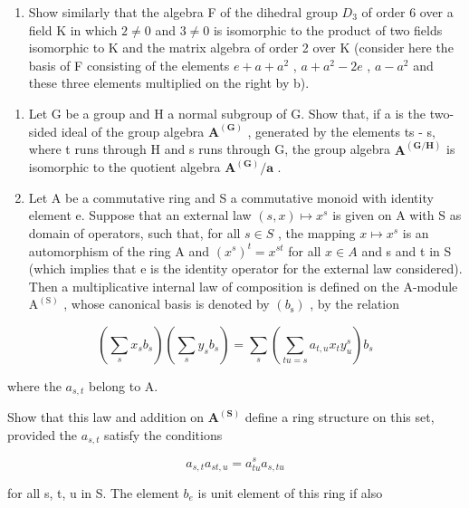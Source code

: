 \begin{enumerate}
\def\labelenumi{(\alph{enumi})}
\setcounter{enumi}{1}
\tightlist
\item
  Show similarly that the algebra F of the dihedral group \(D_{3}\) of order 6 over a field K in which \(2 \neq 0\) and \(3 \neq 0\) is isomorphic to the product of two fields isomorphic to K and the matrix algebra of order 2 over K (consider here the basis of F consisting of the elements \(e + a + a^{2}\) , \(a + a^{2} - 2e\) , \(a - a^{2}\) and these three elements multiplied on the right by b).
\end{enumerate}

\begin{enumerate}
\def\labelenumi{\arabic{enumi}.}
\setcounter{enumi}{9}
\item
  Let G be a group and H a normal subgroup of G. Show that, if a is the two-sided ideal of the group algebra \(\mathbf{A}^{(\mathbf{G})}\) , generated by the elements ts - s, where t runs through H and s runs through G, the group algebra \(\mathbf{A}^{(\mathbf{G}/\mathbf{H})}\) is isomorphic to the quotient algebra \(\mathbf{A}^{(\mathbf{G})}/\mathbf{a}\) .
\item
  Let A be a commutative ring and S a commutative monoid with identity element e. Suppose that an external law \((s, x) \mapsto x^{s}\) is given on A with S as domain of operators, such that, for all \(s \in S\) , the mapping \(x \mapsto x^{s}\) is an automorphism of the ring A and \((x^{s})^{t} = x^{st}\) for all \(x \in A\) and s and t in S (which implies that e is the identity operator for the external law considered). Then a multiplicative internal law of composition is defined on the A-module \(\mathrm{A}^{(\mathrm{S})}\) , whose canonical basis is denoted by \((b_{\mathrm{s}})\) , by the relation
\end{enumerate}

\[
\left(\sum_ {s} x _ {s} b _ {s}\right) \left(\sum_ {s} y _ {s} b _ {s}\right) = \sum_ {s} \left(\sum_ {t u = s} a _ {t, u} x _ {t} y _ {u} ^ {s}\right) b _ {s}
\]

where the \(a_{s,t}\) belong to A.

Show that this law and addition on \(\mathbf{A}^{(\mathbf{S})}\) define a ring structure on this set, provided the \(a_{s,t}\) satisfy the conditions

\[
a _ {s, t} a _ {s t, u} = a _ {t u} ^ {s} a _ {s, t u}
\]

for all s, t, u in S. The element \(b_{e}\) is unit element of this ring if also

